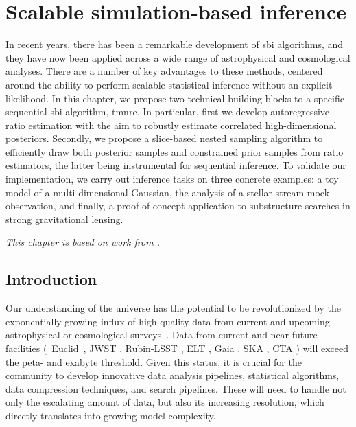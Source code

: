 
\chapter{Scalable simulation-based inference} \label{cha:anre}

In recent years, there has been a remarkable development of \gls*{sbi} algorithms, and they have now been applied across a wide range of astrophysical and cosmological analyses. There are a number of key advantages to these methods, centered around the ability to perform scalable statistical inference without an explicit likelihood. In this chapter, we propose two technical building blocks to a specific sequential \gls*{sbi} algorithm, \gls*{tmnre}. In particular, first we develop autoregressive ratio estimation with the aim to robustly estimate correlated high-dimensional posteriors. Secondly, we propose a slice-based nested sampling algorithm to efficiently draw both posterior samples and constrained prior samples from ratio estimators, the latter being instrumental for sequential inference. To validate our implementation, we carry out inference tasks on three concrete examples: a toy model of a multi-dimensional Gaussian, the analysis of a stellar stream mock observation, and finally, a proof-of-concept application to substructure searches in strong gravitational lensing. 

\textit{This chapter is based on work from \cite{AnauMontel:2023stj}.}


\section{Introduction} \label{sec:anre-intro}

 Our understanding of the universe has the potential to be revolutionized by the exponentially growing influx of high quality data from current and upcoming astrophysical or cosmological surveys~\cite{DiValentino:2020vhf}. Data from current and near-future facilities (\eg~Euclid~\cite{EUCLID:2011zbd}, JWST \cite{Gardner:2006ky}, Rubin-LSST \cite{LSSTDarkEnergyScience:2012kar}, ELT \cite{Neichel:2018aa}, Gaia \cite{Prusti:2016aa}, SKA \cite{Lazio:2009aa}, CTA \cite{Knodlseder:2020onx}) will exceed the peta- and exabyte threshold. Given this status, it is crucial for the community to develop innovative data analysis pipelines, statistical algorithms, data compression techniques, and search pipelines. These will need to handle not only the escalating amount of data, but also its increasing resolution, which directly translates into growing model complexity.

